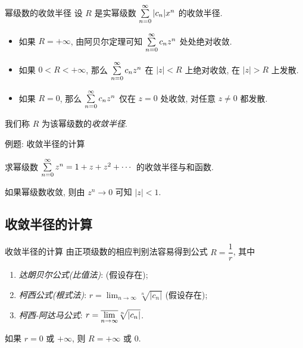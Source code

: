\begin{frame}{幂级数的收敛半径}
	\onslide<+->
	设 $R$ 是实幂级数 $\sum\limits_{n=0}^\infty|c_n|x^n$ 的收敛半径.
	\begin{itemize}
		\item 如果 $R=+\infty$, 由阿贝尔定理可知 $\sum\limits_{n=0}^\infty c_nz^n$ 处处绝对收敛.
		\item 如果 $0<R<+\infty$, 那么 $\sum\limits_{n=0}^\infty c_nz^n$ 在 $|z|<R$ 上绝对收敛, 在 $|z|>R$ 上发散.
		\item 如果 $R=0$, 那么 $\sum\limits_{n=0}^\infty c_nz^n$ 仅在 $z=0$ 处收敛, 对任意 $z\neq 0$ 都发散.
	\end{itemize}
	\onslide<+->
	我们称 $R$ 为该幂级数的\emph{收敛半径}.
	
	\onslide<+->
	\begin{center}
	\end{center}
\end{frame}


\begin{frame}{例题: 收敛半径的计算}
	\onslide<+->
	\begin{example}
		求幂级数 $\sum\limits_{n=0}^\infty z^n=1+z+z^2+\cdots$ 的收敛半径与和函数.
	\end{example}

	\onslide<+->
	\begin{solution}
		如果幂级数收敛, 则由 $z^n\to0$ 可知 $|z|<1$.
		\onslide<+->{因此收敛半径为 $1$.}
	\end{solution}
\end{frame}


\subsection{收敛半径的计算}
\begin{frame}{收敛半径的计算}
	\onslide<+->
	由正项级数的相应判别法容易得到公式 $R=\dfrac1r$, 其中
	\begin{enumerate}
		\item \emph{达朗贝尔公式(比值法)}:  (假设存在);
		\item \emph{柯西公式(根式法)}: $r=\displaystyle\lim_{n\to\infty}\sqrt[n]{|c_n|}$ (假设存在);
		\item \emph{柯西-阿达马公式}: $r=\displaystyle\overline{\lim_{n\to\infty}} \sqrt[n]{|c_n|}$.
	\end{enumerate}
	\onslide<+->
	如果 $r=0$ 或 $+\infty$, 则 $R=+\infty$ 或 $0$.
\end{frame}


